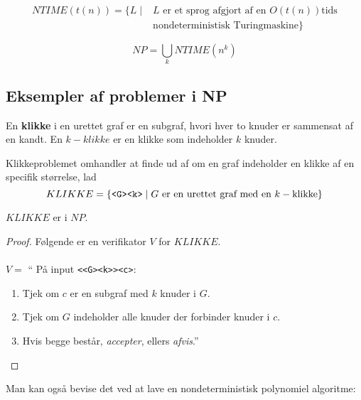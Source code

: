 \begin{definition}
	\begin{align*}
		NTIME(t(n)) = \{ L \mid & L \text{ er et sprog afgjort af en } O(t(n)) \text{tids} \\
		                        & \text{nondeterministisk Turingmaskine}\}
	\end{align*}
\end{definition}


\begin{corollary}
	\begin{equation*}
		NP = \bigcup_{k} NTIME(n^{k})
	\end{equation*}
\end{corollary}


\subsection{Eksempler af problemer i NP}%
\label{subsec:NPexamples}

En \textbf{klikke} i en urettet graf er en subgraf, hvori hver to knuder er sammensat af en kandt. En $k-klikke$ er en klikke som indeholder $k$ knuder.

Klikkeproblemet omhandler at finde ud af om en graf indeholder en klikke af en specifik størrelse, lad
\begin{equation*}
	KLIKKE = \{\text{\texttt{<G><k>}} \mid G \text{ er en urettet graf med en } k-\text{klikke}\}
\end{equation*}

\begin{theorem}
	$KLIKKE$ er i $NP$.
\end{theorem}

\begin{proof}
	Følgende er en verifikator $V$ for $KLIKKE$.\\\\
	\noindent
	$V = $ `` På input \texttt{<<G><k>><c>}:
	\begin{enumerate}
		\item Tjek om $c$ er en subgraf med $k$ knuder i $G$.
		\item Tjek om $G$ indeholder alle knuder der forbinder knuder i $c$.
		\item Hvis begge består, \textit{accepter}, ellers \textit{afvis}.''
	\end{enumerate}
\end{proof}

Man kan også bevise det ved at lave en nondeterministisk polynomiel algoritme:

